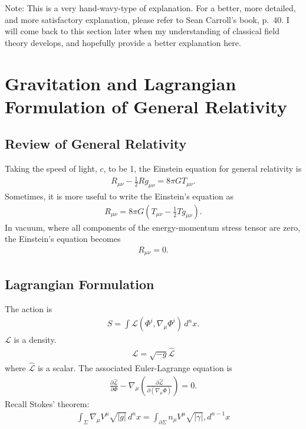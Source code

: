 \documentclass[a4paper,11pt]{article}
\numberwithin{equation}{section}
\theoremstyle{definition}
\newcommand{\p}{\partial}
\newcommand{\lag}{\mathcal{L}}
\begin{document}
Note: This is a very hand-wavy-type of explanation. For a better, more detailed, and more satisfactory explanation, please refer to Sean Carroll's book, p.~40. I will come back to this section later when my understanding of classical field theory develops, and hopefully provide a better explanation here. 

\newpage

\section{Gravitation and Lagrangian Formulation of General Relativity}
\subsection{Review of General Relativity}
Taking the speed of light, $c$, to be 1, the Einstein equation for general relativity is
\begin{align*}
R_{\mu\nu} - \frac{1}{2}Rg_{\mu\nu} = 8\pi GT_{\mu\nu}.
\end{align*}
Sometimes, it is more useful to write the Einstein's equation as
\begin{align*}
R_{\mu\nu} = 8\pi G \left( T_{\mu\nu} - \frac{1}{2}Tg_{\mu\nu} \right).
\end{align*}
In vacuum, where all components of the energy-momentum stress tensor are zero, the Einstein's equation becomes
\begin{align*}
R_{\mu\nu} = 0.
\end{align*}
\subsection{Lagrangian Formulation}
The action is
\begin{align*}
S = \int \lag (\Phi^i, \nabla_\mu \Phi^i)\,d^nx.
\end{align*}
$\lag$ is a density. 
\begin{align*}
\lag = \sqrt{-g}\hat{\lag}
\end{align*}
where $\hat{\lag}$ is a scalar. The associated Euler-Lagrange equation is
\begin{align*}
\frac{\p \hat{\lag}}{\p \Phi} - \nabla_\mu \left( \frac{\p \hat{\lag}}{\p (\nabla_\mu \Phi)}\right) = 0.
\end{align*}
Recall Stokes' theorem:
\begin{align*}
\int_\Sigma \nabla_\mu V^\mu \sqrt{\vert g\vert}\,d^nx = \int_{\p\Sigma} n_\mu V^\mu \sqrt{\vert \gamma \vert},d^{n-1}x
\end{align*}
\end{document}
